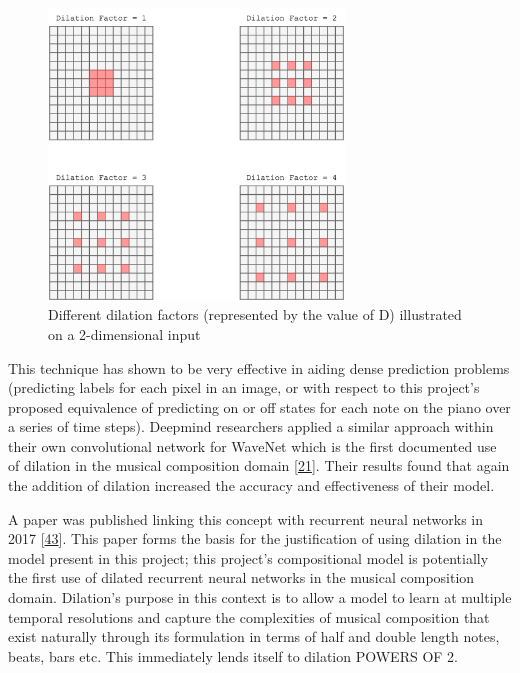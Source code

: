 \documentclass[12pt,]{article}
\begin{document}
\begin{figure}
\centering
\includegraphics[width=0.7\textwidth,height=\textheight]{Images/dilation2d.png}
\caption{Different dilation factors (represented by the value of D)
illustrated on a 2-dimensional input}
\end{figure}

This technique has shown to be very effective in aiding dense prediction
problems (predicting labels for each pixel in an image, or with respect
to this project's proposed equivalence of predicting on or off states
for each note on the piano over a series of time steps). Deepmind
researchers applied a similar approach within their own convolutional
network for WaveNet which is the first documented use of dilation in the
musical composition domain
{[}\protect\hyperlink{ref-oord2016wavenet}{21}{]}. Their results found
that again the addition of dilation increased the accuracy and
effectiveness of their model.

A paper was published linking this concept with recurrent neural
networks in 2017 {[}\protect\hyperlink{ref-chang2017dilated}{43}{]}.
This paper forms the basis for the justification of using dilation in
the model present in this project; this project's compositional model is
potentially the first use of dilated recurrent neural networks in the
musical composition domain. Dilation's purpose in this context is to
allow a model to learn at multiple temporal resolutions and capture the
complexities of musical composition that exist naturally through its
formulation in terms of half and double length notes, beats, bars etc.
This immediately lends itself to dilation POWERS OF 2.
\end{document}
